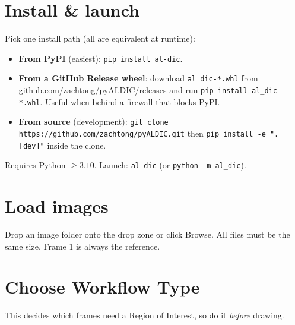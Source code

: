 \documentclass[10pt,letterpaper,twocolumn]{article}
\begin{document}

\section{Install \& launch}

Pick one install path (all are equivalent at runtime):

\begin{itemize}
  \item \textbf{From PyPI} (easiest): \texttt{pip install al-dic}.
  \item \textbf{From a GitHub Release wheel}: download
        \texttt{al\_dic-*.whl} from
        \href{https://github.com/zachtong/pyALDIC/releases}{github.com/zachtong/pyALDIC/releases}
        and run \texttt{pip install al\_dic-*.whl}. Useful when
        behind a firewall that blocks PyPI.
  \item \textbf{From source} (development):
        \texttt{git clone https://github.com/zachtong/pyALDIC.git}
        then \texttt{pip install -e ".[dev]"} inside the clone.
\end{itemize}

Requires Python $\geq 3.10$. Launch:
\texttt{al-dic} (or \texttt{python -m al\_dic}).

\section{Load images}

Drop an image folder onto the drop zone or click Browse. All files
must be the same size. Frame 1 is always the reference.

\section{Choose Workflow Type}

This decides which frames need a Region of Interest, so do it
\emph{before} drawing.
\end{document}
